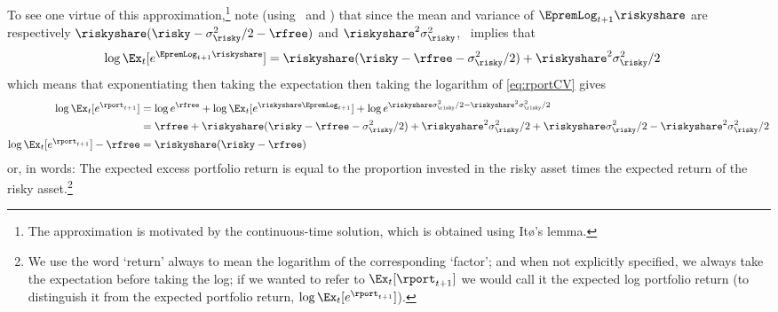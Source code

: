 \documentclass{handout}
\begin{document}
To see one virtue of this approximation,\footnote{The approximation is motivated by the continuous-time solution, which is obtained using It{\o}'s lemma.} note (using \NormTimes~and \SumNormsIsNorm) that since the mean and variance of $\EpremLog_{t+1} \riskyshare$ are respectively $\riskyshare(\risky - \sigma^{2}_{\risky}/2- \rfree)$ and $\riskyshare^{2} \sigma^{2}_{\risky}$, \LogELogNormTimes~implies that  
\begin{equation}\begin{gathered}\begin{aligned}
 \log \Ex_{t}[e^{\EpremLog_{t+1} \riskyshare}] & =  \riskyshare (\risky - \rfree - \sigma^{2}_{\risky}/2) + \riskyshare^{2}\sigma^{2}_{\risky}/2 
\end{aligned}\end{gathered}\end{equation}
which means that exponentiating then taking the expectation then taking the logarithm of \eqref{eq:rportCV} gives 
\begin{equation}\begin{gathered}\begin{aligned}
   \log \Ex_{t}[e^{\rport_{t+1}}] & =  \log e^{\rfree} + \log \Ex_{t}[e^{\riskyshare \EpremLog_{t+1}}] + \log e^{\riskyshare\sigma^{2}_{\risky}/2 - \riskyshare^{2}\sigma^{2}_{\risky}/2}
\\ & =  
\rfree + \riskyshare (\risky-\rfree-\sigma^{2}_{\risky}/2)+\riskyshare^{2}\sigma^{2}_{\risky}/2 +\riskyshare \sigma^{2}_{\risky}/2 - \riskyshare^{2}\sigma^{2}_{\risky}/2 
\\ \log \Ex_{t}[e^{\rport_{t+1}}] - \rfree & =   \riskyshare (\risky-\rfree) \label{eq:rportDist}
\end{aligned}\end{gathered}\end{equation}
or, in words: The expected excess portfolio return is equal to the proportion invested in the risky asset times the expected return of the risky asset.\footnote{We use the word `return' always to mean the logarithm of the corresponding `factor'; and when not explicitly specified, we always take the expectation before taking the log; if we wanted to refer to $\Ex_{t}[\rport_{t+1}]$ we would call it the expected log portfolio return (to distinguish it from the expected portfolio return, $\log \Ex_{t}[e^{\rport_{t+1}}]$).}


\end{document}
